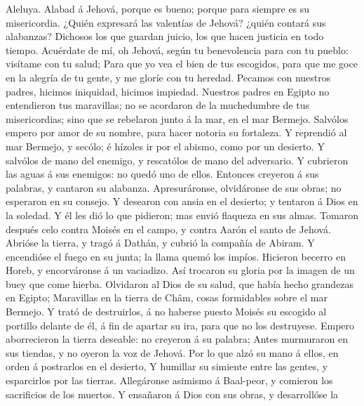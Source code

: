  Aleluya. Alabad á Jehová, porque es bueno; porque para
siempre es su misericordia.  ¿Quién expresará las valentías
de Jehová? ¿quién contará sus alabanzas?  Dichosos los que
guardan juicio, los que hacen justicia en todo tiempo. 
Acuérdate de mí, oh Jehová, según tu benevolencia para con tu pueblo:
visítame con tu salud;  Para que yo vea el bien de tus
escogidos, para que me goce en la alegría de tu gente, y me gloríe con
tu heredad.  Pecamos con nuestros padres, hicimos iniquidad,
hicimos impiedad.  Nuestros padres en Egipto no entendieron
tus maravillas; no se acordaron de la muchedumbre de tus misericordias;
sino que se rebelaron junto á la mar, en el mar Bermejo. 
Salvólos empero por amor de su nombre, para hacer notoria su fortaleza.
 Y reprendió al mar Bermejo, y secólo; é hízoles ir por el
abismo, como por un desierto.  Y salvólos de mano del
enemigo, y rescatólos de mano del adversario.  Y cubrieron
las aguas á sus enemigos: no quedó uno de ellos.  Entonces
creyeron á sus palabras, y cantaron su alabanza. 
Apresuráronse, olvidáronse de sus obras; no esperaron en su consejo.
 Y desearon con ansia en el desierto; y tentaron á Dios en
la soledad.  Y él les dió lo que pidieron; mas envió
flaqueza en sus almas.  Tomaron después celo contra Moisés
en el campo, y contra Aarón el santo de Jehová.  Abrióse la
tierra, y tragó á Dathán, y cubrió la compañía de Abiram. 
Y encendióse el fuego en su junta; la llama quemó los impíos.
 Hicieron becerro en Horeb, y encorváronse á un vaciadizo.
 Así trocaron su gloria por la imagen de un buey que come
hierba.  Olvidaron al Dios de su salud, que había hecho
grandezas en Egipto;  Maravillas en la tierra de Châm,
cosas formidables sobre el mar Bermejo.  Y trató de
destruirlos, á no haberse puesto Moisés su escogido al portillo delante
de él, á fin de apartar su ira, para que no los destruyese.
 Empero aborrecieron la tierra deseable: no creyeron á su
palabra;  Antes murmuraron en sus tiendas, y no oyeron la
voz de Jehová.  Por lo que alzó su mano á ellos, en orden á
postrarlos en el desierto,  Y humillar su simiente entre
las gentes, y esparcirlos por las tierras.  Allegáronse
asimismo á Baal-peor, y comieron los sacrificios de los muertos.
 Y ensañaron á Dios con sus obras, y desarrollóse la

